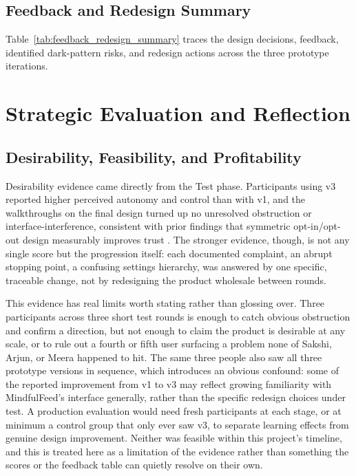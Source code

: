 \documentclass[11pt]{article}
\begin{document}
\subsection{Feedback and Redesign Summary}
Table~\ref{tab:feedback_redesign_summary} traces the design decisions, feedback, identified dark-pattern risks, and redesign actions across the three prototype iterations.

\section{Strategic Evaluation and Reflection}

\subsection{Desirability, Feasibility, and Profitability}
Desirability evidence came directly from the Test phase. Participants using v3 reported higher perceived autonomy and control than with v1, and the walkthroughs on the final design turned up no unresolved obstruction or interface-interference, consistent with prior findings that symmetric opt-in/opt-out design measurably improves trust \parencites[2]{4807303}. The stronger evidence, though, is not any single score but the progression itself: each documented complaint, an abrupt stopping point, a confusing settings hierarchy, was answered by one specific, traceable change, not by redesigning the product wholesale between rounds.

This evidence has real limits worth stating rather than glossing over. Three participants across three short test rounds is enough to catch obvious obstruction and confirm a direction, but not enough to claim the product is desirable at any scale, or to rule out a fourth or fifth user surfacing a problem none of Sakshi, Arjun, or Meera happened to hit. The same three people also saw all three prototype versions in sequence, which introduces an obvious confound: some of the reported improvement from v1 to v3 may reflect growing familiarity with MindfulFeed's interface generally, rather than the specific redesign choices under test. A production evaluation would need fresh participants at each stage, or at minimum a control group that only ever saw v3, to separate learning effects from genuine design improvement. Neither was feasible within this project's timeline, and this is treated here as a limitation of the evidence rather than something the scores or the feedback table can quietly resolve on their own.
\end{document}
